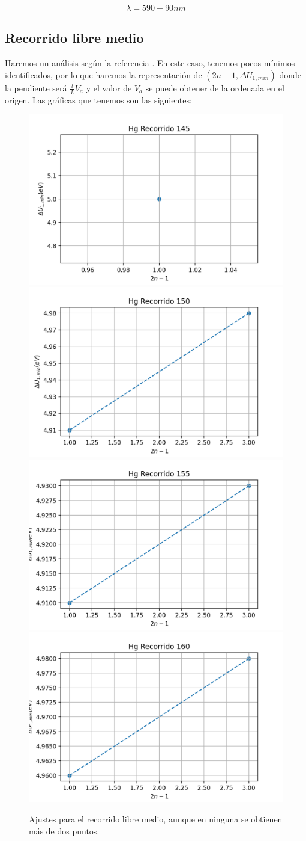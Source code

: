 \documentclass{article}
\begin{document}
$$
\lambda = 590 \pm 90 nm
$$

\subsection{Recorrido libre medio}

Haremos un análisis según la referencia \cite{Rubenza}. En este caso, tenemos pocos mínimos identificados, por lo que haremos la representación de $(2n-1, \Delta U_{1, min})$ donde la pendiente será $\frac{l}{L} V_a$ y el valor de $V_a$ se puede obtener de la ordenada en el origen. Las gráficas que tenemos son las siguientes:

\begin{figure}[h!]
\begin{center}
\includegraphics[max width=0.49\linewidth]{Hg Recorrido 145}
\includegraphics[max width=0.49\linewidth]{Hg Recorrido 150}
\includegraphics[max width=0.49\linewidth]{Hg Recorrido 155}
\includegraphics[max width=0.49\linewidth]{Hg Recorrido 160}
\caption{Ajustes para el recorrido libre medio, aunque en ninguna se obtienen más de dos puntos.}
\end{center}
\end{figure}
\end{document}
